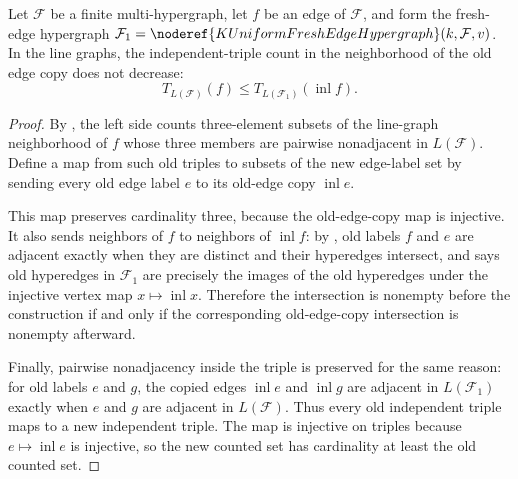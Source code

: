 \begin{helper}
Let $\mathcal F$ be a finite multi-hypergraph, let $f$ be an edge of
$\mathcal F$, and form the fresh-edge hypergraph
\(\mathcal F_1=\noderef{KUniformFreshEdgeHypergraph}(k,\mathcal F,v)\).
In the line graphs, the independent-triple count in the neighborhood of the
old edge copy does not decrease:
\[
T_{L(\mathcal F)}(f)
\le
T_{L(\mathcal F_1)}(\operatorname{inl} f).
\]
\end{helper}
\begin{proof}
By , the left side counts three-element
subsets of the line-graph neighborhood of $f$ whose three members are
pairwise nonadjacent in \(L(\mathcal F)\).  Define a map from such old
triples to subsets of the new edge-label set by sending every old edge label
$e$ to its old-edge copy \(\operatorname{inl} e\).

This map preserves cardinality three, because the old-edge-copy map is
injective.  It also sends neighbors of $f$ to neighbors of
\(\operatorname{inl} f\): by , old labels
$f$ and $e$ are adjacent exactly when they are distinct and their hyperedges
intersect, and  says old hyperedges in
\(\mathcal F_1\) are precisely the images of the old hyperedges under the
injective vertex map \(x\mapsto \operatorname{inl} x\).  Therefore the
intersection is nonempty before the construction if and only if the
corresponding old-edge-copy intersection is nonempty afterward.

Finally, pairwise nonadjacency inside the triple is preserved for the same
reason: for old labels $e$ and $g$, the copied edges \(\operatorname{inl} e\)
and \(\operatorname{inl} g\) are adjacent in \(L(\mathcal F_1)\) exactly when
$e$ and $g$ are adjacent in \(L(\mathcal F)\).  Thus every old independent
triple maps to a new independent triple.  The map is injective on triples
because \(e\mapsto\operatorname{inl} e\) is injective, so the new counted set
has cardinality at least the old counted set.
\end{proof}
